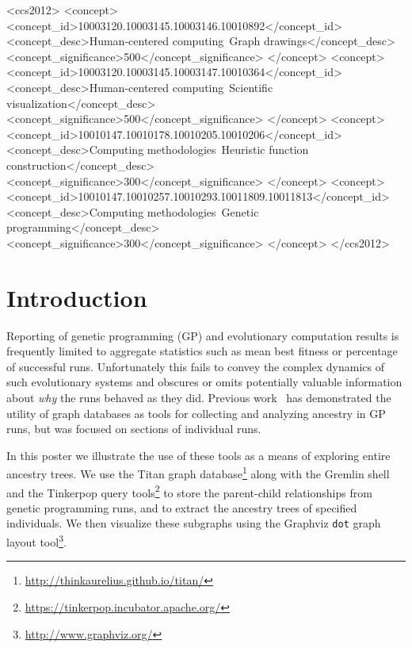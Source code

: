 \documentclass{sig-alternate}
\begin{document}
\begin{CCSXML}
	<ccs2012>
	<concept>
	<concept_id>10003120.10003145.10003146.10010892</concept_id>
	<concept_desc>Human-centered computing~Graph drawings</concept_desc>
	<concept_significance>500</concept_significance>
	</concept>
	<concept>
	<concept_id>10003120.10003145.10003147.10010364</concept_id>
	<concept_desc>Human-centered computing~Scientific visualization</concept_desc>
	<concept_significance>500</concept_significance>
	</concept>
	<concept>
	<concept_id>10010147.10010178.10010205.10010206</concept_id>
	<concept_desc>Computing methodologies~Heuristic function construction</concept_desc>
	<concept_significance>300</concept_significance>
	</concept>
	<concept>
	<concept_id>10010147.10010257.10010293.10011809.10011813</concept_id>
	<concept_desc>Computing methodologies~Genetic programming</concept_desc>
	<concept_significance>300</concept_significance>
	</concept>
	</ccs2012>
\end{CCSXML}


\printccsdesc


\section{Introduction}
\label{sec:introduction}

Reporting of genetic programming (GP) and evolutionary computation results is frequently limited to aggregate statistics such as mean best fitness or percentage of successful runs. Unfortunately this fails to convey the complex dynamics of such evolutionary systems and obscures or omits potentially valuable information about \emph{why} the runs behaved as they did. Previous work~\cite{McPhee:2015:GPTP} has demonstrated the utility of graph databases as tools for collecting and analyzing ancestry in GP runs, but was focused on sections of individual runs.

In this poster we illustrate the use of these tools as a means of exploring entire ancestry trees. We use the Titan graph database\footnote{\url{http://thinkaurelius.github.io/titan/}} along with the Gremlin shell and the Tinkerpop query tools\footnote{\url{https://tinkerpop.incubator.apache.org/}} to store the parent-child relationships from genetic programming runs, and to extract the ancestry trees of specified individuals. We then visualize these subgraphs using the Graphviz \texttt{dot} graph layout tool\footnote{\url{http://www.graphviz.org/}}.
\end{document}
